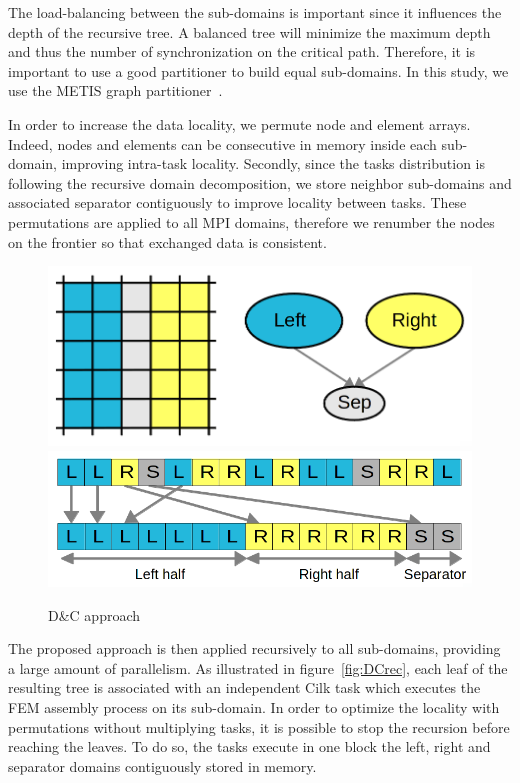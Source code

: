 \documentclass{IOS-Book-Article}
\begin{document}
The load-balancing between the sub-domains is important since it influences the depth of the recursive tree.
A balanced tree will minimize the maximum depth and thus the number of synchronization on the critical path.
Therefore, it is important to use a good partitioner to build equal sub-domains. In this study, we use the METIS graph partitioner~\cite{Metis}.

In order to increase the data locality, we permute node and element arrays.
Indeed, nodes and elements can be consecutive in memory inside each sub-domain, improving intra-task locality.
Secondly, since the tasks distribution is following the recursive domain decomposition, we store neighbor sub-domains and associated separator contiguously
to improve locality between tasks.
These permutations are applied to all MPI domains, therefore we renumber the nodes on the frontier so that exchanged data is consistent.
\begin{figure}[htp]
 \centering
 \includegraphics[scale=0.17]{DC_approach.png}
 \includegraphics[scale=0.21]{Data_permutations.png}
 \caption{D\&C approach}
 \label{fig:DCapp}
\end{figure}

The proposed approach is then applied recursively to all sub-domains, providing a large amount of parallelism.
As illustrated in figure~\ref{fig:DCrec}, each leaf of the resulting tree is associated with an independent Cilk task which executes the FEM assembly process on its sub-domain.
In order to optimize the locality with permutations without multiplying tasks, it is possible to stop the recursion before reaching the leaves.
To do so, the tasks execute in one block the left, right and separator domains contiguously stored in memory.
\end{document}
